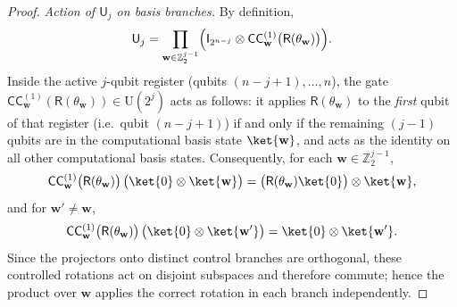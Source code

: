 \documentclass{article}
\newcommand{\CC}{\mathsf{C}\mathsf{C}}
\newcommand{\rI}{\mathsf{I}}
\newcommand{\rR}{\mathsf{R}}
\newcommand{\rU}{\mathsf{U}}
\numberwithin{equation}{section}
\begin{document}
\begin{proof}
\smallskip
\noindent\emph{Action of $\rU_j$ on basis branches.}
By definition,
\[
\rU_j=\prod_{\mathbf{w}\in\mathbb{Z}_2^{j-1}}\Bigl(\rI_{2^{n-j}}\otimes \CC_{\mathbf{w}}^{(1)}\bigl(\rR(\theta_{\mathbf{w}})\bigr)\Bigr).
\]
Inside the active $j$-qubit register (qubits $(n-j+1),\dots,n$), the gate
$\CC_{\mathbf{w}}^{(1)}(\rR(\theta_{\mathbf{w}}))\in\mathrm{U}(2^j)$ acts as follows:
it applies $\rR(\theta_{\mathbf{w}})$ to the \emph{first} qubit of that register (i.e.\ qubit $(n-j+1)$)
if and only if the remaining $(j-1)$ qubits are in the computational basis state $\ket{\mathbf{w}}$, and
acts as the identity on all other computational basis states.
Consequently, for each $\mathbf{w}\in\mathbb{Z}_2^{j-1}$,
\begin{equation}\label{eq:control_action}
\CC_{\mathbf{w}}^{(1)}\bigl(\rR(\theta_{\mathbf{w}})\bigr)\,\bigl(\ket{0}\otimes\ket{\mathbf{w}}\bigr)
=\bigl(\rR(\theta_{\mathbf{w}})\ket{0}\bigr)\otimes\ket{\mathbf{w}},
\end{equation}
and for $\mathbf{w}'\neq \mathbf{w}$,
\[
\CC_{\mathbf{w}}^{(1)}\bigl(\rR(\theta_{\mathbf{w}})\bigr)\,\bigl(\ket{0}\otimes\ket{\mathbf{w}'}\bigr)
=\ket{0}\otimes\ket{\mathbf{w}'}.
\]
Since the projectors onto distinct control branches are orthogonal, these controlled rotations act on
disjoint subspaces and therefore commute; hence the product over $\mathbf{w}$ applies the correct rotation in each
branch independently.


\end{proof}
\end{document}
